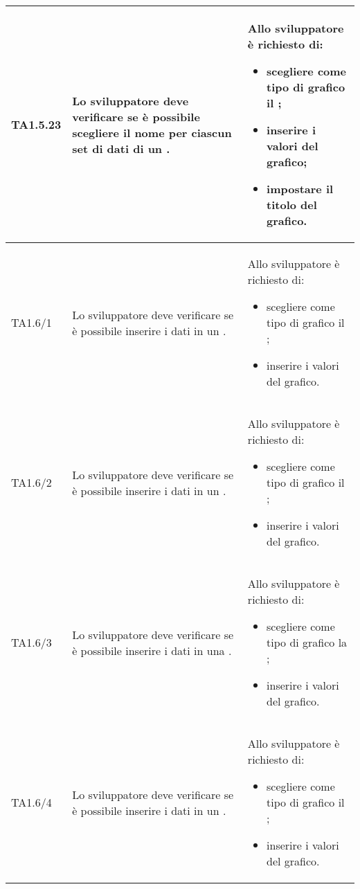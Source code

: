 \begin{longtabu}{| X[0.5] | X | X |}
	TA1.5.23 & Lo sviluppatore deve verificare se è possibile scegliere il nome per ciascun set di dati di un .

		& Allo sviluppatore è richiesto di:
		\begin{itemize}
			\item scegliere come tipo di grafico il ;
			\item inserire i valori del grafico;
			\item impostare il titolo del grafico.
		\end{itemize}
\\ \hline

	TA1.6/1 & Lo sviluppatore deve verificare se è possibile inserire i dati in un .

		& Allo sviluppatore è richiesto di:
		\begin{itemize}
			\item scegliere come tipo di grafico il ;
			\item inserire i valori del grafico.
		\end{itemize}
\\ \hline	
			
	TA1.6/2 & Lo sviluppatore deve verificare se è possibile inserire i dati in un .

		& Allo sviluppatore è richiesto di:
		\begin{itemize}
			\item scegliere come tipo di grafico il ;
			\item inserire i valori del grafico.
		\end{itemize}
\\ \hline	

	TA1.6/3 & Lo sviluppatore deve verificare se è possibile inserire i dati in una .

		& Allo sviluppatore è richiesto di:
		\begin{itemize}
			\item scegliere come tipo di grafico la ;
			\item inserire i valori del grafico.
		\end{itemize}
\\ \hline	

	TA1.6/4 & Lo sviluppatore deve verificare se è possibile inserire i dati in un .

		& Allo sviluppatore è richiesto di:
		\begin{itemize}
			\item scegliere come tipo di grafico il ;
			\item inserire i valori del grafico.
		\end{itemize}
\\ \hline


\end{longtabu}
